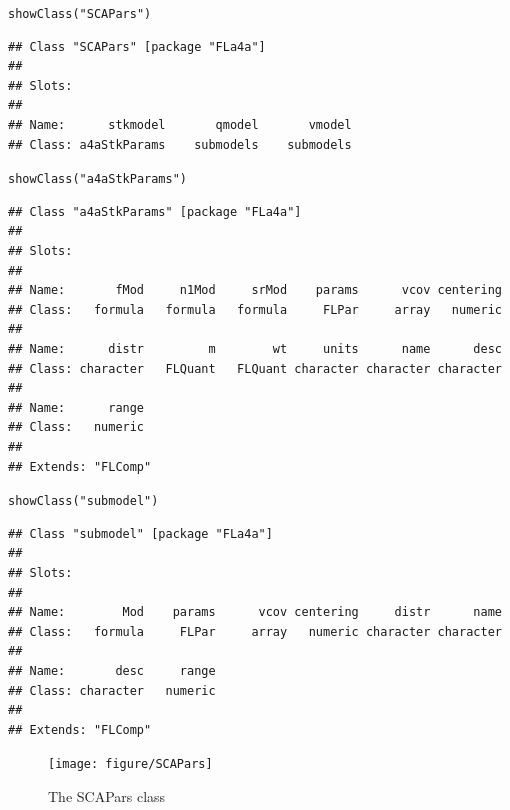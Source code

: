 \documentclass[a4paper,english,10pt]{article}\usepackage[]{graphicx}\usepackage[]{color}
\makeatletter
\newcommand{\hlstr}[1]{\textcolor[rgb]{0.2,0.2,0.2}{#1}}%
\newcommand{\hlstd}[1]{\textcolor[rgb]{0,0,0}{#1}}%
\newcommand{\hlkwd}[1]{\textcolor[rgb]{0.361,0.506,0.596}{#1}}%
\newenvironment{kframe}{%
 \def\at@end@of@kframe{}%
 \ifinner\ifhmode%
  \def\at@end@of@kframe{\end{minipage}}%
  \begin{minipage}{\columnwidth}%
 \fi\fi%
 \def\FrameCommand##1{\hskip\@totalleftmargin \hskip-\fboxsep
 \colorbox{shadecolor}{##1}\hskip-\fboxsep
     \hskip-\linewidth \hskip-\@totalleftmargin \hskip\columnwidth}%
 \MakeFramed {\advance\hsize-\width
   \@totalleftmargin\z@ \linewidth\hsize
   \@setminipage}}%
 {\par\unskip\endMakeFramed%
 \at@end@of@kframe}
\newenvironment{knitrout}{}{} %
\makeatother
\begin{document}
\begin{knitrout}
\color{fgcolor}\begin{kframe}
\begin{alltt}
\hlkwd{showClass}\hlstd{(}\hlstr{"SCAPars"}\hlstd{)}
\end{alltt}
\begin{verbatim}
## Class "SCAPars" [package "FLa4a"]
## 
## Slots:
##                                              
## Name:      stkmodel       qmodel       vmodel
## Class: a4aStkParams    submodels    submodels
\end{verbatim}
\begin{alltt}
\hlkwd{showClass}\hlstd{(}\hlstr{"a4aStkParams"}\hlstd{)}
\end{alltt}
\begin{verbatim}
## Class "a4aStkParams" [package "FLa4a"]
## 
## Slots:
##                                                                   
## Name:       fMod     n1Mod     srMod    params      vcov centering
## Class:   formula   formula   formula     FLPar     array   numeric
##                                                                   
## Name:      distr         m        wt     units      name      desc
## Class: character   FLQuant   FLQuant character character character
##                 
## Name:      range
## Class:   numeric
## 
## Extends: "FLComp"
\end{verbatim}
\begin{alltt}
\hlkwd{showClass}\hlstd{(}\hlstr{"submodel"}\hlstd{)}
\end{alltt}
\begin{verbatim}
## Class "submodel" [package "FLa4a"]
## 
## Slots:
##                                                                   
## Name:        Mod    params      vcov centering     distr      name
## Class:   formula     FLPar     array   numeric character character
##                           
## Name:       desc     range
## Class: character   numeric
## 
## Extends: "FLComp"
\end{verbatim}
\end{kframe}
\end{knitrout}

\begin{knitrout}
\color{fgcolor}\begin{figure}[H]


{\centering \texttt{[image: figure/SCAPars]} 

}

\caption[The SCAPars class]{The SCAPars class\label{fig:SCAPars}}
\end{figure}


\end{knitrout}
\end{document}
